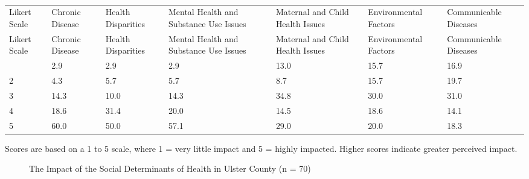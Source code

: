 \documentclass[
  english,
  letterpaper,
]{report}
\begin{document}
\begin{longtable}[]{@{}lllllll@{}}

\caption{\label{tbl-uc-impact-hlth-issue}The Impact of Health Issues in
Ulster County (n = 73)}

\tabularnewline

\caption{}\label{T_a2379}\tabularnewline
\toprule\noalign{}
Likert Scale & Chronic Disease & Health Disparities & Mental Health and
Substance Use Issues & Maternal and Child Health Issues & Environmental
Factors & Communicable Diseases \\
\midrule\noalign{}
\endfirsthead
\toprule\noalign{}
Likert Scale & Chronic Disease & Health Disparities & Mental Health and
Substance Use Issues & Maternal and Child Health Issues & Environmental
Factors & Communicable Diseases \\
\midrule\noalign{}
\endhead
\bottomrule\noalign{}
\endlastfoot
1 & 2.9 & 2.9 & 2.9 & 13.0 & 15.7 & 16.9 \\
2 & 4.3 & 5.7 & 5.7 & 8.7 & 15.7 & 19.7 \\
3 & 14.3 & 10.0 & 14.3 & 34.8 & 30.0 & 31.0 \\
4 & 18.6 & 31.4 & 20.0 & 14.5 & 18.6 & 14.1 \\
5 & 60.0 & 50.0 & 57.1 & 29.0 & 20.0 & 18.3 \\

\end{longtable}

\begin{tcolorbox}[enhanced jigsaw, breakable, leftrule=.75mm, title=\textcolor{quarto-callout-note-color}{\faInfo}\hspace{0.5em}{Note}, bottomrule=.15mm, opacityback=0, left=2mm, colback=white, bottomtitle=1mm, coltitle=black, colbacktitle=quarto-callout-note-color!10!white, colframe=quarto-callout-note-color-frame, opacitybacktitle=0.6, toptitle=1mm, titlerule=0mm, arc=.35mm, rightrule=.15mm, toprule=.15mm]

Scores are based on a 1 to 5 scale, where 1 = very little impact and 5 =
highly impacted. Higher scores indicate greater perceived impact.

\end{tcolorbox}

\begin{figure}


\caption{\label{fig-uc-impact-sdoh}The Impact of the Social Determinants
of Health in Ulster County (n = 70)}

\end{figure}%
\end{document}
